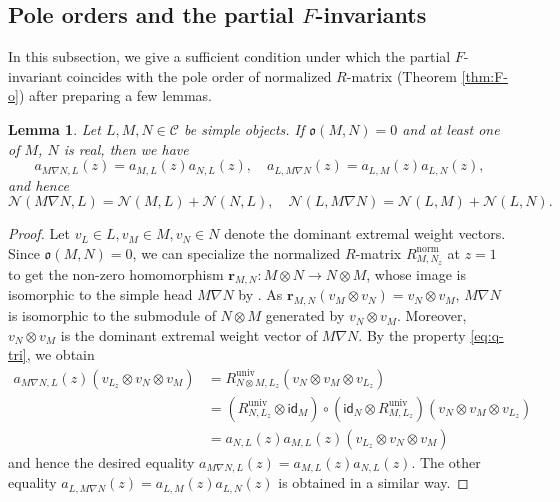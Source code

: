 \documentclass[12pt]{amsart}
\newtheorem{lemma}[theorem]{Lemma}
\theoremstyle{definition}
\theoremstyle{remark}
\numberwithin{equation}{section}
\begin{document}
\subsection{Pole orders and the partial $F$-invariants}
In this subsection, we give a sufficient condition under which the partial $F$-invariant coincides with the pole order of normalized $R$-matrix (Theorem \ref{thm:F-o}) after preparing a few lemmas. 

\begin{lemma} \label{Lem:alinear}
Let $L,M,N \in \mathscr{C}$ be simple objects. 
If $\mathfrak{o}(M,N) = 0$ and at least one of $M$, $N$ is real, then we have
\[ a_{M\nabla N, L}(z) = a_{M,L}(z) a_{N,L}(z), \quad  a_{L,M\nabla N}(z) = a_{L,M}(z) a_{L,N}(z),\]
and hence
\[
 \mathscr{N}(M \nabla N, L) = \mathscr{N}(M,L)+\mathscr{N}(N,L), \quad \mathscr{N}(L, M \nabla N) = \mathscr{N}(L,M)+\mathscr{N}(L,N).
\]
\end{lemma}
\begin{proof}
 Let $v_L \in L, v_M \in M, v_N \in N$ denote the dominant extremal weight vectors. Since $\mathfrak{o}(M,N)=0$, we can specialize the normalized $R$-matrix $R^{\mathrm{norm}}_{M,N_z}$ at $z=1$ to get the non-zero homomorphism $\mathbf{r}_{M,N} \colon M \otimes N \to N \otimes M$, whose image is isomorphic to the simple head $M \nabla N$ by \cite[Theorem 3.12]{KKKO-2015}.   
As $\mathbf{r}_{M,N}(v_M \otimes v_N) = v_N \otimes v_M$, $M \nabla N$ is isomorphic to the submodule of $N \otimes M$ generated by $v_N \otimes v_M$. 
Moreover, $v_N \otimes v_M$ is the dominant extremal weight vector of $M \nabla N$.
By the property \eqref{eq:q-tri}, we obtain
\begin{align*}
a_{M \nabla N, L}(z) (v_{L_z} \otimes v_N \otimes v_M) &= R^{\mathrm{univ}}_{N \otimes M, L_z} (v_N \otimes v_M \otimes v_{L_z}) \\
&= (R^{\mathrm{univ}}_{N,L_z} \otimes \mathsf{id}_M) \circ (\mathsf{id}_N \otimes R^{\mathrm{univ}}_{M, L_z}) (v_N \otimes v_M \otimes v_{L_z}) \\
&= a_{N,L}(z) a_{M,L}(z)  (v_{L_z} \otimes v_N \otimes v_M)
\end{align*}
and hence the desired equality $a_{M\nabla N, L}(z) = a_{M,L}(z) a_{N,L}(z)$.
The other equality $a_{L,M\nabla N}(z) = a_{L,M}(z) a_{L,N}(z)$ is obtained in a similar way.
\end{proof}
\end{document}

